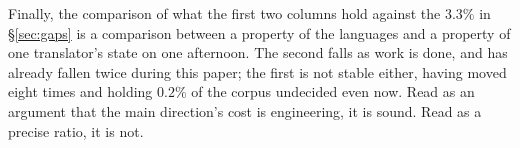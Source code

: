 Finally, the comparison of what the first two columns hold against the $3.3\%$ in
\S\ref{sec:gaps} is a comparison between a property of the languages and a property of
one translator's state on one afternoon. The second falls as work is done, and has
already fallen twice during this paper; the first is not stable either, having moved
eight times and holding $0.2\%$ of the corpus undecided even now. Read as an argument that the main direction's cost is
engineering, it is sound. Read as a precise ratio, it is not.
